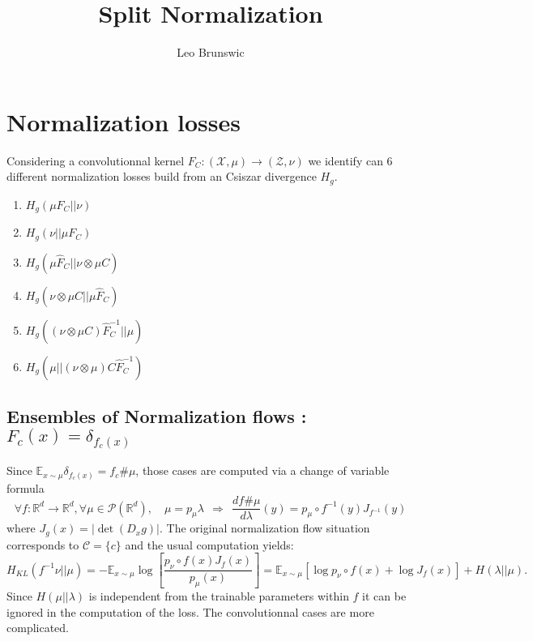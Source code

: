 \documentclass[a4paper,10pt]{article}
\title{Split Normalization}
\author{Leo Brunswic}
\def\X{\mathcal{X}}
\def\Z{\mathcal{Z}}
\def\P{\mathcal{P}}
\def\RR{\mathbb{R}}
\def\EE{\mathbb{E}}
\begin{document}
\maketitle

\begin{abstract}

\end{abstract}

\section{Normalization losses}

Considering a convolutionnal kernel $F_C:(\X,\mu)\rightarrow (\Z,\nu)$ we identify can 6 different  normalization losses build from an Csiszar divergence $H_g$.
\begin{enumerate}
 \item $H_g(\mu F_C || \nu)$
 \item $H_g(\nu||\mu F_C)$
 \item $H_g(\mu \widehat F_C || \nu \otimes \mu C)$
 \item $H_g( \nu \otimes \mu C || \mu \widehat F_C)$
 \item $H_g( (\nu \otimes \mu C) \widehat F_C^{-1}|| \mu )$
 \item $H_g( \mu || (\nu \otimes \mu) C \widehat F_C^{-1})$
 \end{enumerate}

 \subsection{Ensembles of Normalization flows : $F_c(x) = \delta_{f_c(x)}$}
Since $\EE_{x\sim \mu} \delta_{f_c(x)}  = f_c\# \mu$, those cases are computed via a change of variable formula
$$\forall f : \RR^d \rightarrow \RR^ d,\forall \mu\in \P(\RR^d), \quad  \mu = p_\mu  \lambda ~~\Rightarrow~~\frac{d f\#\mu}{d\lambda}(y) = p_{\mu} \circ f^{-1}(y) J_{f^{-1}}(y)   $$
where $J_g(x) = |\det(D_x g)|$.
The original normalization flow situation corresponds to $\mathcal C=\{c\}$ and the usual computation yields:
$$ H_{KL}(f^{-1}\nu||\mu) = -\EE_{x\sim \mu} \log \left[ \frac{p_{\nu} \circ f(x) J_{f}(x)}{p_\mu(x)}\right] = \EE_{x\sim \mu}\left[ \log p_{\nu} \circ f(x) +  \log J_{f}(x) \right] + H(\lambda|| \mu).$$
Since  $H(\mu||\lambda)$ is independent from the trainable parameters within $f$ it can be ignored in the computation of the loss. The convolutionnal cases are more complicated.
\end{document}
